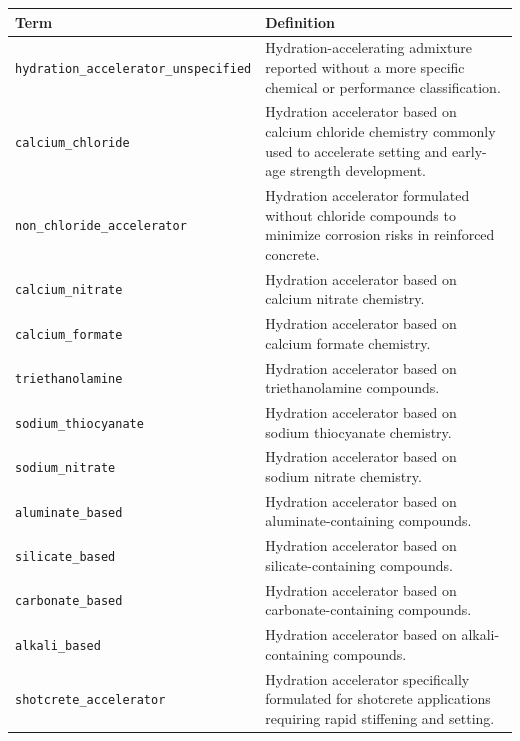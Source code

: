 \documentclass[11pt]{book}
\begin{document}
{\begin{longtable}{p{}p{}}
\hline
\textbf{Term} & \textbf{Definition} \\
\hline
\endhead

\texttt{hydration\_accelerator\_unspecified} &
Hydration-accelerating admixture reported without a more specific chemical or performance classification. \\

\texttt{calcium\_chloride} &
Hydration accelerator based on calcium chloride chemistry commonly used to accelerate setting and early-age strength development. \\

\texttt{non\_chloride\_accelerator} &
Hydration accelerator formulated without chloride compounds to minimize corrosion risks in reinforced concrete. \\

\texttt{calcium\_nitrate} &
Hydration accelerator based on calcium nitrate chemistry. \\

\texttt{calcium\_formate} &
Hydration accelerator based on calcium formate chemistry. \\

\texttt{triethanolamine} &
Hydration accelerator based on triethanolamine compounds. \\

\texttt{sodium\_thiocyanate} &
Hydration accelerator based on sodium thiocyanate chemistry. \\

\texttt{sodium\_nitrate} &
Hydration accelerator based on sodium nitrate chemistry. \\

\texttt{aluminate\_based} &
Hydration accelerator based on aluminate-containing compounds. \\

\texttt{silicate\_based} &
Hydration accelerator based on silicate-containing compounds. \\

\texttt{carbonate\_based} &
Hydration accelerator based on carbonate-containing compounds. \\

\texttt{alkali\_based} &
Hydration accelerator based on alkali-containing compounds. \\

\texttt{shotcrete\_accelerator} &
Hydration accelerator specifically formulated for shotcrete applications requiring rapid stiffening and setting. \\


\end{longtable}}
\end{document}
